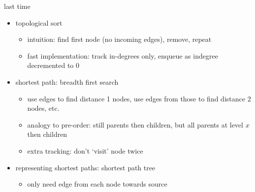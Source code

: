\begin{comment}
    \begin{frame}{last time}
    \begin{itemize}
    \item Huffman decoding --- construct + follow tree
    \item Huffman lab format, etc. reminders
        \begin{itemize}
        \item printable ASCII only --- 0x20 to 0x7e
        \end{itemize}
    \item graph definitions
        \begin{itemize}
        \item directed v undirected
        \item paths and cycles
        \item connected (undirected), weakly connected and strongly conneted (directed)
        \end{itemize}
    \item graph representations and their pros/cons
        \begin{itemize}
        \item adjacency matrix --- entry for every pair, no lists
        \item adjacency lists --- list for every vertex
        \end{itemize}
    \end{itemize}
\end{frame}
\end{comment}


\begin{frame}{last time}
    \begin{itemize}
    \item topological sort
        \begin{itemize}
            \item intuition: find first node (no incoming edges), remove, repeat
            \item fast implementation: track in-degrees only, enqueue as indegree decremented to 0
        \end{itemize}
    \item shortest path: breadth first search
        \begin{itemize}
        \item use edges to find distance 1 nodes, use edges from those to find distance 2 nodes, etc.
        \item analogy to pre-order: still parents then children, but all parents at level $x$ then children
        \item extra tracking: don't `visit' node twice
        \end{itemize}
    \item representing shortest paths: shortest path tree
        \begin{itemize}
        \item only need edge from each node towards source
        \end{itemize}
    \end{itemize}
\end{frame}
